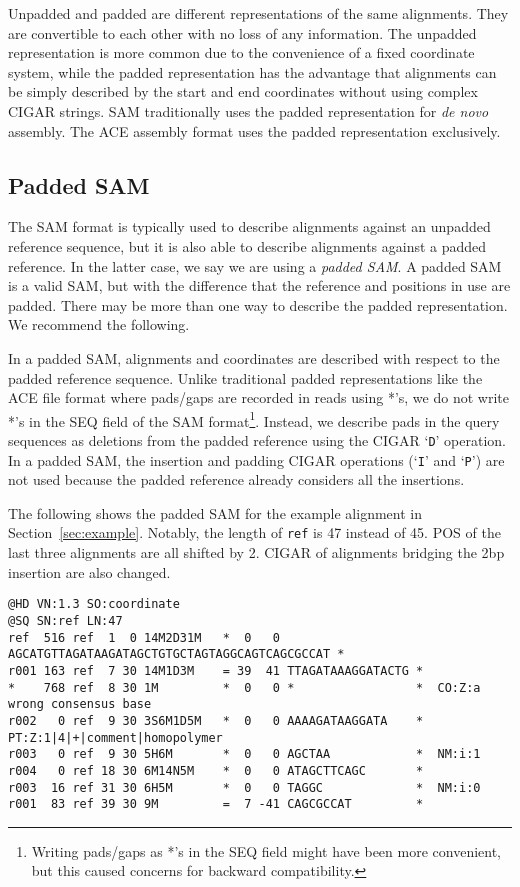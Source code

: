 \documentclass[10pt]{article}
\begin{document}
Unpadded and padded are different representations of the same alignments. They
are convertible to each other with no loss of any information. The unpadded
representation is more common due to the convenience of a fixed coordinate system,
while the padded representation has the advantage that alignments can be simply
described by the start and end coordinates without using complex CIGAR strings.
SAM traditionally uses the padded representation for {\it de novo} assembly.
The ACE assembly format uses the padded representation exclusively.

\subsection{Padded SAM}

The SAM format is typically used to describe alignments against an unpadded
reference sequence, but it is also able to describe alignments against a padded
reference. In the latter case, we say we are using a \emph{padded SAM}. A padded
SAM is a valid SAM, but with the difference that the reference and positions in
use are padded. There may be more than one way to describe the padded
representation. We recommend the following.

In a padded SAM, alignments and coordinates are described with respect to the
padded reference sequence. Unlike traditional padded representations like
the ACE file format where pads/gaps are recorded in reads using *'s, we do
not write *'s in the {\sf SEQ} field of the SAM format\footnote{Writing
pads/gaps as *'s in the {\sf SEQ} field might have been more convenient, but
this caused concerns for backward compatibility.}. Instead, we describe pads
in the query sequences as deletions from the padded reference using the
{\sf CIGAR} `{\tt D}' operation. In a padded SAM, the insertion and padding
CIGAR operations (`{\tt I}' and `{\tt P}') are not used because the padded
reference already considers all the insertions.

The following shows the padded SAM for the example alignment in Section~\ref{sec:example}.
Notably, the length of {\tt ref} is 47 instead of 45. {\sf POS} of the last
three alignments are all shifted by 2. {\sf CIGAR} of alignments bridging the
2bp insertion are also changed.

\begin{framed}\small
\begin{verbatim}
@HD VN:1.3 SO:coordinate
@SQ SN:ref LN:47
ref  516 ref  1  0 14M2D31M   *  0   0 AGCATGTTAGATAAGATAGCTGTGCTAGTAGGCAGTCAGCGCCAT *
r001 163 ref  7 30 14M1D3M    = 39  41 TTAGATAAAGGATACTG *
*    768 ref  8 30 1M         *  0   0 *                 *  CO:Z:a wrong consensus base
r002   0 ref  9 30 3S6M1D5M   *  0   0 AAAAGATAAGGATA    *  PT:Z:1|4|+|comment|homopolymer
r003   0 ref  9 30 5H6M       *  0   0 AGCTAA            *  NM:i:1
r004   0 ref 18 30 6M14N5M    *  0   0 ATAGCTTCAGC       *
r003  16 ref 31 30 6H5M       *  0   0 TAGGC             *  NM:i:0
r001  83 ref 39 30 9M         =  7 -41 CAGCGCCAT         *
\end{verbatim}
\end{framed}
\end{document}
